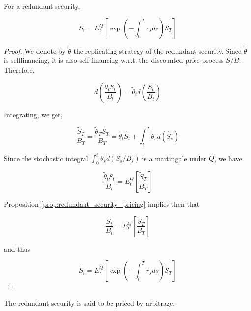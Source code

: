 \documentclass[\topdir/lecture\_notes.tex]{subfiles}
\begin{document}
\begin{proposition}\label{prop:redundant_security_martingale}
For a redundant security,

\begin{equation*}
\tilde{S}_{t}=E_{t}^{Q}\left[\exp \left(-\int_{t}^{T} r_{s} d s\right) \tilde{S}_{T}\right]
\end{equation*}
\end{proposition}

\begin{proof}
We denote by \(\tilde{\theta}\) the replicating strategy of the redundant security. Since \(\tilde{\theta}\) is selffinancing, it is also self-financing w.r.t. the discounted price process \(S / B\). Therefore,

\begin{equation*}
d\left(\frac{\tilde{\theta}_{t} S_{t}}{B_{t}}\right)=\tilde{\theta}_{t} d\left(\frac{S_{t}}{B_{t}}\right)
\end{equation*}

Integrating, we get,

\begin{equation*}
\frac{\tilde{S}_{T}}{B_{T}}=\frac{\tilde{\theta}_{T} S_{T}}{B_{T}}=\tilde{\theta}_{t} \hat{S}_{t}+\int_{t}^{T} \tilde{\theta}_{s} d\left(\hat{S}_{s}\right)
\end{equation*}

Since the stochastic integral \(\int_{0}^{t} \theta_{s} d\left(S_{s} / B_{s}\right)\) is a martingale under \(Q\), we have

\begin{equation*}
\frac{\tilde{\theta}_{t} S_{t}}{B_{t}}=E_{t}^{Q}\left[\frac{\tilde{S}_{T}}{B_{T}}\right]
\end{equation*}

Proposition \ref{prop:redundant_security_pricing} implies then that

\begin{equation*}
\frac{\tilde{S}_{t}}{B_{t}}=E_{t}^{Q}\left[\frac{\tilde{S}_{T}}{B_{T}}\right]
\end{equation*}

and thus

\begin{equation*}
\tilde{S}_{t}=E_{t}^{Q}\left[\exp \left(-\int_{t}^{T} r_{s} d s\right) \tilde{S}_{T}\right]
\end{equation*}

\end{proof}

The redundant security is said to be priced by arbitrage.
\end{document}
